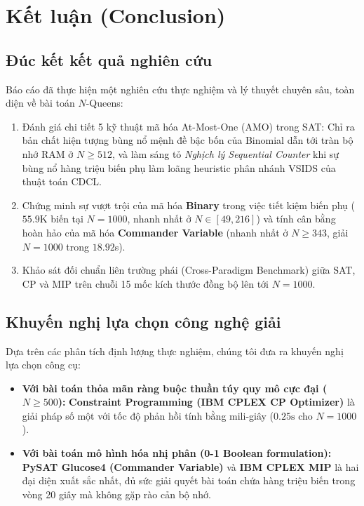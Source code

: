 \documentclass[a4paper,fleqn]{cas-sc}
\begin{document}
\section{Kết luận (Conclusion)}
\label{sec:conclusion}

\subsection{Đúc kết kết quả nghiên cứu}
\label{subsec:conclusion_summary}
Báo cáo đã thực hiện một nghiên cứu thực nghiệm và lý thuyết chuyên sâu, toàn diện về bài toán $N$-Queens:
\begin{enumerate}
    \item Đánh giá chi tiết 5 kỹ thuật mã hóa At-Most-One (AMO) trong SAT: Chỉ ra bản chất hiện tượng bùng nổ mệnh đề bậc bốn của Binomial dẫn tới tràn bộ nhớ RAM ở $N \ge 512$, và làm sáng tỏ \textit{Nghịch lý Sequential Counter} khi sự bùng nổ hàng triệu biến phụ làm loãng heuristic phân nhánh VSIDS của thuật toán CDCL.
    \item Chứng minh sự vượt trội của mã hóa \textbf{Binary} trong việc tiết kiệm biến phụ ($55.9\text{K}$ biến tại $N=1000$, nhanh nhất ở $N \in [49, 216]$) và tính cân bằng hoàn hảo của mã hóa \textbf{Commander Variable} (nhanh nhất ở $N \ge 343$, giải $N = 1000$ trong $18.92$s).
    \item Khảo sát đối chuẩn liên trường phái (Cross-Paradigm Benchmark) giữa SAT, CP và MIP trên chuỗi 15 mốc kích thước đồng bộ lên tới $N = 1000$.
\end{enumerate}

\subsection{Khuyến nghị lựa chọn công nghệ giải}
\label{subsec:recommendations}
Dựa trên các phân tích định lượng thực nghiệm, chúng tôi đưa ra khuyến nghị lựa chọn công cụ:
\begin{itemize}
    \item \textbf{Với bài toán thỏa mãn ràng buộc thuần túy quy mô cực đại ($N \ge 500$):} \textbf{Constraint Programming (IBM CPLEX CP Optimizer)} là giải pháp số một với tốc độ phản hồi tính bằng mili-giây ($0.25\text{s}$ cho $N = 1000$).
    \item \textbf{Với bài toán mô hình hóa nhị phân (0-1 Boolean formulation):} \textbf{PySAT Glucose4 (Commander Variable)} và \textbf{IBM CPLEX MIP} là hai đại diện xuất sắc nhất, đủ sức giải quyết bài toán chứa hàng triệu biến trong vòng 20 giây mà không gặp rào cản bộ nhớ.
\end{itemize}
\end{document}
